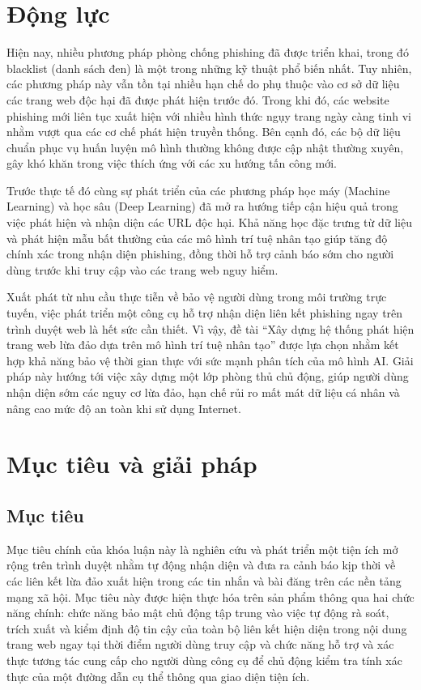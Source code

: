 \section{Động lực}
Hiện nay, nhiều phương pháp phòng chống phishing đã được triển khai, trong đó blacklist (danh sách đen) là một trong những kỹ thuật phổ biến nhất. Tuy nhiên, các phương pháp này vẫn tồn tại nhiều hạn chế do phụ thuộc vào cơ sở dữ liệu các trang web độc hại đã được phát hiện trước đó. Trong khi đó, các website phishing mới liên tục xuất hiện với nhiều hình thức ngụy trang ngày càng tinh vi nhằm vượt qua các cơ chế phát hiện truyền thống. Bên cạnh đó, các bộ dữ liệu chuẩn phục vụ huấn luyện mô hình thường không được cập nhật thường xuyên, gây khó khăn trong việc thích ứng với các xu hướng tấn công mới.

Trước thực tế đó cùng sự phát triển của các phương pháp học máy (Machine Learning) và học sâu (Deep Learning) đã mở ra hướng tiếp cận hiệu quả trong việc phát hiện và nhận diện các URL độc hại. Khả năng học đặc trưng từ dữ liệu và phát hiện mẫu bất thường của các mô hình trí tuệ nhân tạo giúp tăng độ chính xác trong nhận diện phishing, đồng thời hỗ trợ cảnh báo sớm cho người dùng trước khi truy cập vào các trang web nguy hiểm.

Xuất phát từ nhu cầu thực tiễn về bảo vệ người dùng trong môi trường trực tuyến, việc phát triển một công cụ hỗ trợ nhận diện liên kết phishing ngay trên trình duyệt web là hết sức cần thiết. Vì vậy, đề tài “Xây dựng hệ thống phát hiện trang web lừa đảo dựa trên mô hình trí tuệ nhân tạo” được lựa chọn nhằm kết hợp khả năng bảo vệ thời gian thực với sức mạnh phân tích của mô hình AI. Giải pháp này hướng tới việc xây dựng một lớp phòng thủ chủ động, giúp người dùng nhận diện sớm các nguy cơ lừa đảo, hạn chế rủi ro mất mát dữ liệu cá nhân và nâng cao mức độ an toàn khi sử dụng Internet.

\section{Mục tiêu và giải pháp}
\label{sec:muc-tieu-pham-vi}
\subsection{Mục tiêu }
   Mục tiêu chính của khóa luận này là nghiên cứu và phát triển một tiện ích mở rộng trên trình duyệt nhằm tự động nhận diện và đưa ra cảnh báo kịp thời về các liên kết lừa đảo xuất hiện trong các tin nhắn và bài đăng trên các nền tảng mạng xã hội. Mục tiêu này được hiện thực hóa trên sản phẩm thông qua hai chức năng chính: chức năng bảo mật chủ động tập trung vào việc tự động rà soát, trích xuất và kiểm định độ tin cậy của toàn bộ liên kết hiện diện trong nội dung trang web ngay tại thời điểm người dùng truy cập  và chức năng hỗ trợ và xác thực tương tác cung cấp cho người dùng công cụ để chủ động kiểm tra tính xác thực của một đường dẫn cụ thể thông qua giao diện tiện ích.

